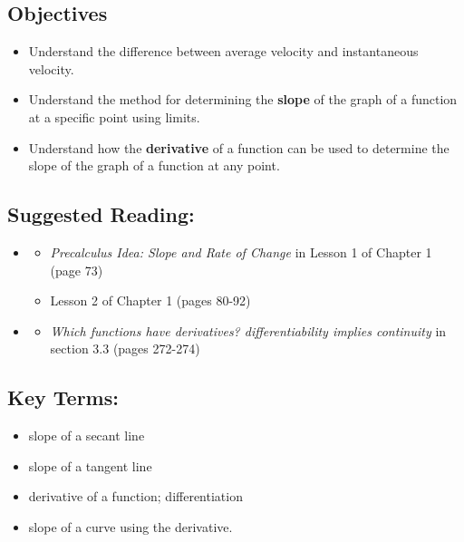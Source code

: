 \vspace{-0.25 in}
\begin{framed}
\subsection*{Objectives}
\begin{itemize}
    \item Understand the difference between average velocity and instantaneous velocity.
    \item Understand the method for determining the \textbf{slope} of the graph of a function at a specific point using limits.
    \item Understand how the \textbf{derivative} of a function can be used to determine the slope of the graph of a function at any point.
\end{itemize}

\subsection*{Suggested Reading:}
\begin{itemize}
\item \cite{Calaway}
    \begin{itemize}
        \item \emph{Precalculus Idea: Slope and Rate of Change} in Lesson 1 of Chapter 1 (page 73)
        \item Lesson 2 of Chapter 1 (pages 80-92)
        
    \end{itemize}
\item \cite{Hoffman}
    \begin{itemize}
        \item \emph{Which functions have derivatives? differentiability implies continuity} in section 3.3 (pages 272-274)
    \end{itemize}
\end{itemize}
\subsection*{Key Terms:} 

\begin{multicols}{2}
\begin{itemize}
    \item slope of a secant line
    \item slope of a tangent line
    \item derivative of a function; differentiation
    \item slope of a curve using the derivative.
\end{itemize}
\end{multicols}
\end{framed}

